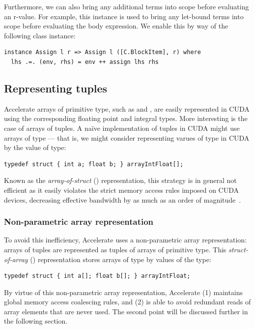 Furthermore, we can also bring any additional terms into scope before evaluating
an r-value. For example, this instance is used to bring any let-bound terms into
scope before evaluating the body expression. We enable this by way of the
following class instance:
%
\begin{lstlisting}[style=haskell]
instance Assign l r => Assign l ([C.BlockItem], r) where
  lhs .=. (env, rhs) = env ++ assign lhs rhs
\end{lstlisting}


\subsection{Representing tuples}

Accelerate arrays of primitive type, such as  and , are
easily represented in CUDA using the corresponding floating point and integral
types. More interesting is the case of arrays of tuples. A na\"ive
implementation of tuples in CUDA might use arrays of  type --- that
is, we might consider representing varues of type 
in CUDA by the value of type:
%
\begin{lstlisting}[style=cuda]
typedef struct { int a; float b; } arrayIntFloat[];
\end{lstlisting}
%
Known as the \emph{array-of-struct} (\AoS{})
representation, this strategy is in general not efficient as it easily violates
the strict memory access rules imposed on CUDA devices, decreasing effective
bandwidth by as much as an order of magnitude~\cite{NVIDIA:2012wf}.

\subsubsection{Non-parametric array representation}

To avoid this inefficiency, Accelerate uses a non-parametric array
representation: arrays of tuples are represented as tuples of arrays of
primitive type. This \emph{struct-of-array} (\SoA{}) representation stores arrays of type  by values of the type:
%
\begin{lstlisting}[style=cuda]
typedef struct { int a[]; float b[]; } arrayIntFloat;
\end{lstlisting}
%
By virtue of this non-parametric array representation, Accelerate (1) maintains
global memory access coalescing rules, and (2) is able to avoid redundant reads
of array elements that are never used. The second point will be discussed
further in the following section.

